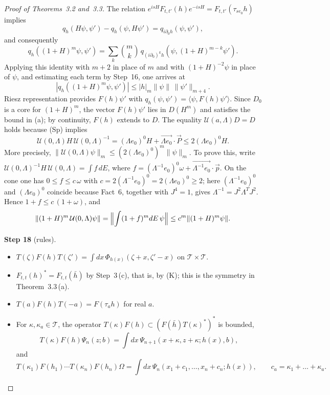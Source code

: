 \documentclass[11pt]{amsart}
\theoremstyle{definition}
\begin{document}
\begin{proof}[Proof of Theorems~3.2 and~3.3]
The relation $e^{isH}F_{t,t'}(h)e^{-isH}=F_{t,t'}(\tau_{se_0}h)$ implies
\begin{equation*}
q_h(H\psi,\psi')-q_h(\psi,H\psi')=q_{i\partial_0h}(\psi,\psi'),
\end{equation*}
and consequently
\begin{equation*}
q_h((1+H)^m\psi,\psi')=\sum_k\binom mk\,q_{(i\partial_0)^kh}(\psi,(1+H)^{m-k}\psi').
\end{equation*}
Applying this identity with $m+2$ in place of $m$ and with $(1+H)^{-2}\psi$ in place of $\psi$, and estimating each term by Step~16, one arrives at
\begin{equation*}
|q_h((1+H)^m\psi,\psi')|\le|h|_m\|\psi\|\,\|\psi'\|_{m+4}.
\end{equation*}
Riesz representation provides $F(h)\psi'$ with $q_h(\psi,\psi')=\langle\psi,F(h)\psi'\rangle$.
Since $D_0$ is a core for $(1+H)^m$, the vector $F(h)\psi'$ lies in $D(H^m)$ and satisfies the bound in (a); by continuity, $F(h)$ extends to $D$.
The equality $\mathcal U(a,\Lambda)D=D$ holds because (Sp) implies
\begin{equation*}
\mathcal U(0,\Lambda)H\,\mathcal U(0,\Lambda)^{-1}=(\Lambda e_0)^0H+\overrightarrow{\Lambda e_0}\cdot\vec P\le2(\Lambda e_0)^0H.
\end{equation*}
More precisely, $\|\mathcal U(0,\Lambda)\psi\|_m\le(2(\Lambda e_0)^0)^m\|\psi\|_m$.
To prove this, write $\mathcal U(0,\Lambda)^{-1}H\,\mathcal U(0,\Lambda)=\int f\,dE$, where $f=\allowbreak (\Lambda^{-1}e_0)^0\omega+\overrightarrow{\Lambda^{-1}e_0}\cdot\vec p$.
On the cone one has $0\le f\le c\,\omega$ with $c=2(\Lambda^{-1}e_0)^0=2(\Lambda e_0)^0\ge2$; here $(\Lambda^{-1}e_0)^0$ and $(\Lambda e_0)^0$ coincide because Fact~6, together with $J^4=1$, gives $\Lambda^{-1}=J^2\Lambda^TJ^2$.
Hence $1+f\le c\,(1+\omega)$, and
\begin{equation*}
\|(1+H)^m\,\mathcal U(0,\Lambda)\psi\|=\Bigl\|\int(1+f)^mdE\,\psi\Bigr\|\le c^m\|(1+H)^m\psi\|.
\end{equation*}

\textbf{Step 18} (rules).
\begin{itemize}
\item[(e1)] $T(\zeta)F(h)T(\zeta')=\int dx\,\Phi_{h(x)}(\zeta+x,\zeta'-x)$ on $\mathcal T\times\mathcal T$.
\item[(e2)] $F_{t,t}(h)^*=F_{t,t}(\bar h)$ by Step~3\,(c), that is, by (K); this is the symmetry in Theorem~3.3\,(a).
\item[(e3)] $T(a)F(h)T(-a)=F(\tau_ah)$ for real $a$.
\item[(e4)] For $\kappa,\kappa_a\in\mathcal T$, the operator $T(\kappa)F(h)\subset(F(\bar h)T(\kappa)^*)^*$ is bounded,
\begin{equation*}
T(\kappa)F(h)\Psi_n(z;b)=\int dx\,\Psi_{n+1}(x+\kappa,z+\kappa;h(x),b),
\end{equation*}
and
\begin{equation*}
T(\kappa_1)F(h_1)\cdots T(\kappa_n)F(h_n)\Omega=\int dx\,\Psi_n(x_1+c_1,\dots,x_n+c_n;h(x)),\qquad c_a=\kappa_1+\dots+\kappa_a.
\end{equation*}
\end{itemize}


\end{proof}
\end{document}
